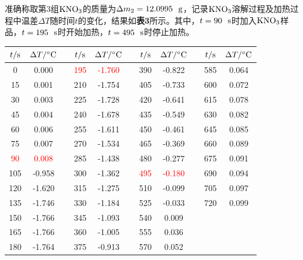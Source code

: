 \documentclass[12pt]{article}
\begin{document}
准确称取第3组$\rm KNO_{3}$的质量为$\Delta m_{2}=12.0995\ \ {\rm g}$，记录$\rm KNO_{3}$溶解过程及加热过程中温差$\Delta T$随时间$t$的变化，结果如\textbf{表3}所示。其中，$t=90\ \ {\rm s}$时加入$\rm KNO_{3}$样品，$t=195\ \ {\rm s}$时开始加热，$t=495\ \ {\rm s}$时停止加热。
\begin{table}[h]
	\centering
	\begin{tabular}{ccccccccccc}
		\toprule
		$t/{\rm s}$ & $\Delta T/{\rm ^{\circ}C}$ & & $t/{\rm s}$ & $\Delta T/{\rm ^{\circ}C}$& & 	$t/{\rm s}$ & $\Delta T/{\rm ^{\circ}C}$ & & $t/{\rm s}$ & $\Delta T/{\rm ^{\circ}C}$ \\
		\midrule
		0   & 0.000  &  & \textcolor{red}{195} & \textcolor{red}{-1.760} &  & 390 & -0.822 &  & 585 & 0.064 \\
		15  & 0.001  &  & 210 & -1.754 &  & 405 & -0.733 &  & 600 & 0.072 \\
		30  & 0.003  &  & 225 & -1.728 &  & 420 & -0.641 &  & 615 & 0.078 \\
		45  & 0.004  &  & 240 & -1.678 &  & 435 & -0.549 &  & 630 & 0.082 \\
		60  & 0.006  &  & 255 & -1.611 &  & 450 & -0.461 &  & 645 & 0.085 \\
		75  & 0.007  &  & 270 & -1.534 &  & 465 & -0.369 &  & 660 & 0.089 \\
		\textcolor{red}{90}  & \textcolor{red}{0.008}  &  & 285 & -1.438 &  & 480 & -0.277 &  & 675 & 0.091 \\
		105 & -0.958 &  & 300 & -1.362 &  & \textcolor{red}{495} & \textcolor{red}{-0.180} &  & 690 & 0.094 \\
		120 & -1.620 &  & 315 & -1.275 &  & 510 & -0.099 &  & 705 & 0.097 \\
		135 & -1.746 &  & 330 & -1.184 &  & 525 & -0.033 &  & 720 & 0.099 \\
		150 & -1.766 &  & 345 & -1.093 &  & 540 & 0.009  &  &     &       \\
		165 & -1.766 &  & 360 & -1.005 &  & 555 & 0.036  &  &     &       \\
		180 & -1.764 &  & 375 & -0.913 &  & 570 & 0.052  &  &     &       \\
		\bottomrule
	\end{tabular}
\end{table}
\par
\end{document}
